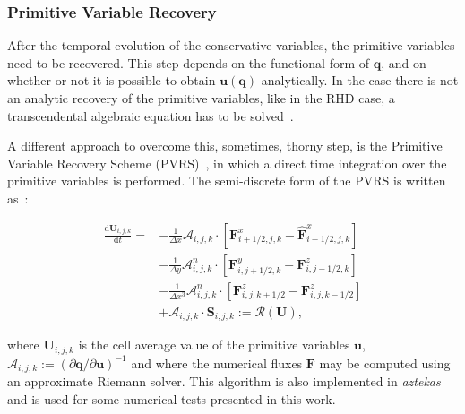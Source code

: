 \subsubsection{Primitive Variable Recovery}
\label{subsubsec:primitiverecovery}

After the temporal evolution of the conservative variables, the primitive variables need to be recovered. This  step depends on the functional form of $\mathbf{q}$, and on whether or not it is possible to obtain $\mathbf{u}(\mathbf{q})$ analytically. In the case there is not an analytic recovery of the primitive variables, like in the RHD case, a transcendental algebraic equation has to be solved~\citep{riccardi2008}. 

A different approach to overcome this, sometimes, thorny step, is the Primitive Variable Recovery Scheme (PVRS)~\citep[see][]{aguayo2018}, in which a direct time integration over the primitive variables is performed. The semi-discrete form of the PVRS is written as~\citep{aguayo2018}:

\begin{equation}
\begin{split}
    \frac{\mathrm{d} \mathbf{U}_{i,j,k}}{\mathrm{d}t} =  &- \frac{1}{\Delta x} \mathcal{A}_{i,j,k} \cdot \left[
    \mathbf{F}^x_{i+1/2,j,k} - \mathbf{\hat{F}}^x_{i-1/2,j,k}
    \right]\\
    &- \frac{1}{\Delta y} \mathcal{A}_{i,j,k}^n \cdot \left[
    \mathbf{F}^y_{i,j+1/2,k} - \mathbf{{F}}^z_{i,j-1/2,k}
    \right]\\ 
    &- \frac{1}{\Delta x^3} \mathcal{A}_{i,j,k}^n \cdot \left[
    \mathbf{F}^z_{i,j,k+1/2} - \mathbf{F}^z_{i,j,k-1/2}
    \right]\\
    & + \mathcal{A}_{i,j,k} \cdot \mathbf{S}_{i,j,k} := \mathcal{R}(\mathbf{U}),
\end{split}
\label{eq:pvrs}
\end{equation}

\noindent where $\mathbf{U}_{i,j,k}$ is the cell average value of the primitive variables $\mathbf{u}$, $\mathcal{A}_{i,j,k} := (\partial \mathbf{q}/\partial \mathbf{u})^{-1}$ and where the numerical fluxes $\mathbf{F}$ may be computed using an approximate Riemann solver. This algorithm is also implemented in \textit{aztekas} and is used for some numerical tests presented in this work.

